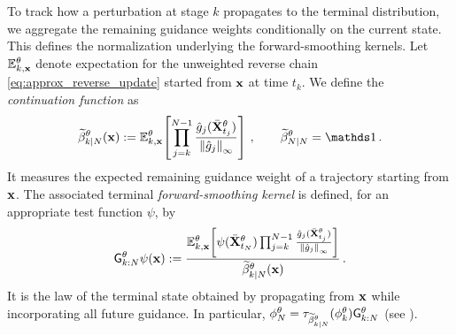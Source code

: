 \documentclass[11pt]{article}
\theoremstyle{plain}
\theoremstyle{definition}
\theoremstyle{remark}
\begin{document}
To track how a perturbation at stage \(k\) propagates to the terminal distribution, we aggregate the remaining guidance weights conditionally on the current state. This defines the normalization underlying the forward-smoothing kernels.
Let $\mathbb E_{k,\mathbf{x}}^{\theta}$ denote expectation for the unweighted reverse chain \eqref{eq:approx_reverse_update} started from $\mathbf{x}$ at time $t_k$. We define the
\emph{continuation function} as
\begin{equation}
\label{eq:approx_backward_functions_main_norm}
\normbackwardfun{k}{N}[\theta][\x]
\eqdef \mathbb E_{k,\x}^{\theta}\!\left[ \prod_{j=k}^{N-1} \frac{\approxpot{j}(\Xbar_{t_j}^{\theta})} {\norminfty{\approxpot{j}}}
\right] \eqsp, \qquad \normbackwardfun{N}{N}[\theta]=\un \eqsp.
\end{equation}
It measures the expected remaining guidance weight of a trajectory
starting from $\mathbf{x}$. The associated terminal \emph{forward-smoothing kernel} is defined, for
an appropriate test function $\psi$, by
\begin{equation}
\label{eq:forward_smoothing_interpretation_main}
\prodfsmk{k}{N}[\theta]\psi(\x)
\eqdef \frac{ \mathbb E_{k,\x}^{\theta}\!\left[ \psi(\Xbar_{t_N}^{\theta}) \prod_{j=k}^{N-1} \frac{\approxpot{j}(\Xbar_{t_j}^{\theta})}{\norminfty{\approxpot{j}}} \right]
}{ \normbackwardfun{k}{N}[\theta][\x] } \eqsp.
\end{equation}
It is the law of the terminal state obtained by propagating from
$\mathbf{x}$ while incorporating all future guidance. In particular, $\approxfilter{N}
= \tau_{\normbackwardfun{k}{N}[\theta]} (\approxfilter{k}) \prodfsmk{k}{N}[\theta]$ (see ).
\end{document}
